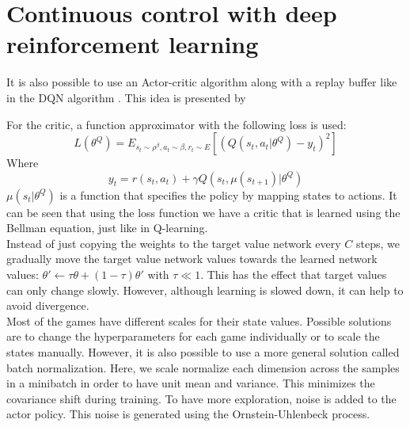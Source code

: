 \section{Continuous control with deep reinforcement learning}
It is also possible to use an Actor-critic algorithm along with a replay buffer like in the DQN algorithm \parencite{Mnih2015Human-levelLearning}. This idea is presented by \cite{Lillicrap2015ContinuousLearning}

For the critic, a function approximator with the following loss is used:
\begin{equation}
L(\theta^Q) = E_{s_t \sim \rho^{\beta}, a_t \sim \beta, r_t \sim E} \left [ (Q(s_t, a_t \vert \theta^Q) - y_t)^2 \right ]
\end{equation}
Where
\begin{equation}
y_t = r(s_t,a_t) + \gamma Q(s_t, \mu(s_{t+1}) \vert \theta^Q)
\end{equation}
$\mu(s_t \vert \theta^Q)$ is a function that specifies the policy by mapping states to actions.
It can be seen that using the loss function we have a critic that is learned using the Bellman equation, just like in Q-learning.\\

Instead of just copying the weights to the target value network every $C$ steps, we gradually move the target value network values towards the learned network values: $\theta' \leftarrow \tau \theta + (1-\tau) \theta'$ with $\tau \ll 1$.
This has the effect that target values can only change slowly.
However, although learning is slowed down, it can help to avoid divergence.\\

Most of the games have different scales for their state values.
Possible solutions are to change the hyperparameters for each game individually or to scale the states manually.
However, it is also possible to use a more general solution called batch normalization.
Here, we scale normalize each dimension across the samples in a minibatch in order to have unit mean and variance.
This minimizes the covariance shift during training.
To have more exploration, noise is added to the actor policy.
This noise is generated using the Ornstein-Uhlenbeck process.

